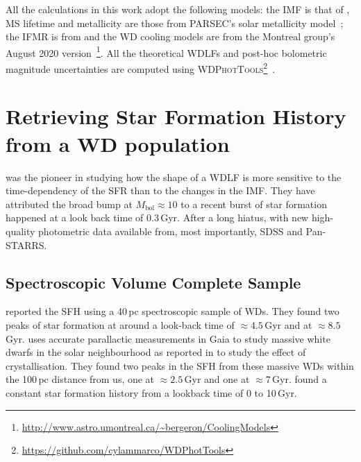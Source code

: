 \documentclass[fleqn,usenatbib]{mnras}
\begin{document}
All the calculations in this work adopt the following models: the IMF is that of
\citet{2003PASP..115..763C}, MS lifetime and metallicity are those from
PARSEC's solar metallicity model~\citep[Z=0.017, Y=0.279;][]{2012MNRAS.427..127B}; the IFMR is
from \citet{2008MNRAS.387.1693C} and the WD cooling models are from the
Montreal group's August 2020 version~\citep{2020ApJ...901...93B}\footnote{\url{http://www.astro.umontreal.ca/~bergeron/CoolingModels}}.
All the theoretical WDLFs and post-hoc bolometric magnitude uncertainties are
computed using \textsc{WDPhotTools}\footnote{\url{https://github.com/cylammarco/WDPhotTools}}~\citep{marco_c_lam_2022_6595029, 
2022RASTI...1...81L}.

\section{Retrieving Star Formation History from a WD population}
\citet{1990ApJ...352..605N} was the pioneer in studying how the shape of
a WDLF is more sensitive to the time-dependency of the SFR than to the changes
in the IMF. They have attributed the broad bump at $M_{\mathrm{bol}} \approx 10$
to a recent burst of star formation happened at a look back time of 0.3\,Gyr.
After a long hiatus, with new high-quality photometric data available from,
most importantly, SDSS and Pan-STARRS.

\subsection{Spectroscopic Volume Complete Sample}
\citet[][hereafter, T14]{2014ApJ...791...92T} reported the SFH using a 40\,pc spectroscopic sample
of WDs. They found two peaks of star formation at around a look-back time of
$\approx4.5$\,Gyr and at $\approx8.5$\,Gyr. \citet{2019ApJ...878L..11I}
uses accurate parallactic measurements in Gaia to study massive white dwarfs in
the solar neighbourhood as reported in \citet{2019Natur.565..202T} to study the
effect of crystallisation. They found two peaks in the SFH from these massive
WDs within the 100\,pc distance from us, one at $\approx2.5$\,Gyr and one at
$\approx7$\,Gyr. \citet[][hereafter, C23]{2023MNRAS.522.1643C} found a constant star formation
history from a lookback time of 0 to 10\,Gyr.
\end{document}
